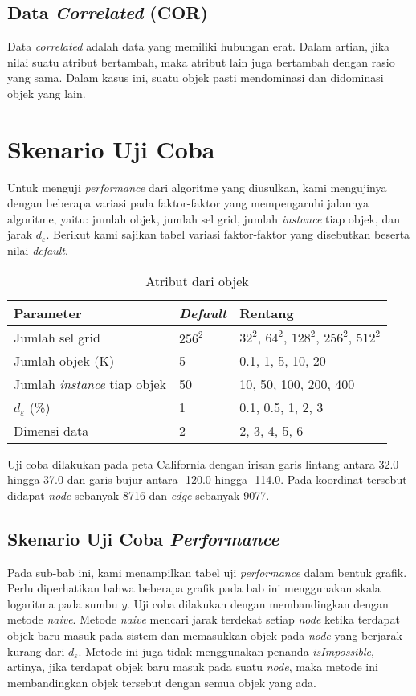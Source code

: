 \subsection{Data \textit{Correlated} (COR)}
\tab Data \textit{correlated} adalah data yang memiliki hubungan erat. Dalam artian, jika nilai suatu atribut bertambah, maka atribut lain juga bertambah dengan rasio yang sama. Dalam kasus ini, suatu objek pasti mendominasi dan didominasi objek yang lain.

\section{Skenario Uji Coba} \label{skenarioujicoba}

\tab Untuk menguji \textit{performance} dari algoritme yang diusulkan, kami mengujinya dengan beberapa variasi pada faktor-faktor yang mempengaruhi jalannya algoritme, yaitu: jumlah objek, jumlah sel grid, jumlah \textit{instance} tiap objek, dan jarak $ d_\varepsilon $. Berikut kami sajikan tabel variasi faktor-faktor yang disebutkan beserta nilai \textit{default}.

\begin{table}[!htb]
	\centering
	\begin{tabular}{| l | l | l |}
		\hline
		\textbf{Parameter} & \textbf{\textit{Default}} & \textbf {Rentang} \\ \hline
		Jumlah sel grid & $ 256^2 $ & $ 32^2 $, $ 64^2 $, $ 128^2 $, $ 256^2 $, $ 512^2 $ \\ \hline
		Jumlah objek (K) & 5 & 0.1, 1, 5, 10, 20 \\ \hline
		Jumlah \textit{instance} tiap objek & 50 & 10, 50, 100, 200, 400 \\ \hline
		$ d_\varepsilon $ (\%) & 1 & 0.1, 0.5, 1, 2, 3 \\ \hline
		Dimensi data & 2 & 2, 3, 4, 5, 6 \\ \hline
	\end{tabular}
	\caption{Atribut dari objek
		\label{tab:uji}}
\end{table}

\tab Uji coba dilakukan pada peta California\cite{ontrip} dengan irisan garis lintang antara 32.0 hingga 37.0 dan garis bujur antara -120.0 hingga -114.0. Pada koordinat tersebut didapat \textit{node} sebanyak 8716 dan \textit{edge} sebanyak 9077.

\subsection{Skenario Uji Coba \textit{Performance}}
\tab Pada sub-bab ini, kami menampilkan tabel uji \textit{performance} dalam bentuk grafik. Perlu diperhatikan bahwa beberapa grafik pada bab ini menggunakan skala logaritma pada sumbu \textit{y}. Uji coba dilakukan dengan membandingkan dengan metode \textit{naive}. Metode \textit{naive} mencari jarak terdekat setiap \textit{node} ketika terdapat objek baru masuk pada sistem dan memasukkan objek pada \textit{node} yang berjarak kurang dari $ d_\varepsilon $. Metode ini juga tidak menggunakan penanda \textit{isImpossible}, artinya, jika terdapat objek baru masuk pada suatu \textit{node}, maka metode ini membandingkan objek tersebut dengan semua objek yang ada.

